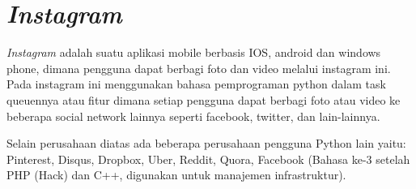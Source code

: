 \section*{\textit{Instagram}}
\textit{Instagram} adalah suatu aplikasi mobile berbasis IOS, android dan windows phone, dimana pengguna dapat berbagi foto dan video melalui instagram ini. Pada instagram ini menggunakan bahasa pemprograman python dalam task queuennya atau fitur dimana setiap pengguna dapat berbagi foto atau video ke beberapa social network lainnya seperti facebook, twitter, dan lain-lainnya.

Selain perusahaan diatas ada beberapa perusahaan pengguna Python lain yaitu: Pinterest, Disqus, Dropbox, Uber, Reddit, Quora, Facebook (Bahasa ke-3 setelah PHP (Hack) dan C++, digunakan untuk manajemen infrastruktur).
\par

